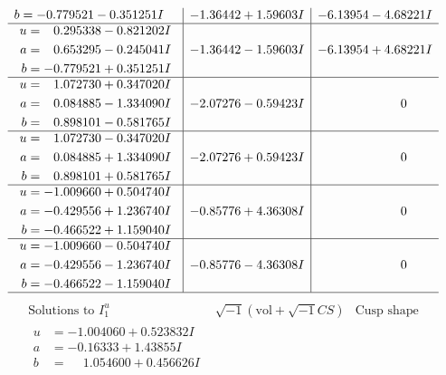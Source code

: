 \documentclass[1p]{elsarticle_modified}
\theoremstyle{definition}
\newcommand{\I}{\sqrt{-1}}
\begin{document}
$$\begin{array}{c|c|c}
\begin{aligned}
b &= -0.779521 - 0.351251 I\end{aligned}
 & -1.36442 + 1.59603 I & -6.13954 - 4.68221 I \\ \hline\begin{aligned}
u &= \phantom{-}0.295338 - 0.821202 I \\
a &= \phantom{-}0.653295 - 0.245041 I \\
b &= -0.779521 + 0.351251 I\end{aligned}
 & -1.36442 - 1.59603 I & -6.13954 + 4.68221 I \\ \hline\begin{aligned}
u &= \phantom{-}1.072730 + 0.347020 I \\
a &= \phantom{-}0.084885 - 1.334090 I \\
b &= \phantom{-}0.898101 - 0.581765 I\end{aligned}
 & -2.07276 - 0.59423 I & \phantom{-0.000000 } 0 \\ \hline\begin{aligned}
u &= \phantom{-}1.072730 - 0.347020 I \\
a &= \phantom{-}0.084885 + 1.334090 I \\
b &= \phantom{-}0.898101 + 0.581765 I\end{aligned}
 & -2.07276 + 0.59423 I & \phantom{-0.000000 } 0 \\ \hline\begin{aligned}
u &= -1.009660 + 0.504740 I \\
a &= -0.429556 + 1.236740 I \\
b &= -0.466522 + 1.159040 I\end{aligned}
 & -0.85776 + 4.36308 I & \phantom{-0.000000 } 0 \\ \hline\begin{aligned}
u &= -1.009660 - 0.504740 I \\
a &= -0.429556 - 1.236740 I \\
b &= -0.466522 - 1.159040 I\end{aligned}
 & -0.85776 - 4.36308 I & \phantom{-0.000000 } 0\\
 \hline 
 \end{array}$$\newpage$$\begin{array}{c|c|c}  
\text{Solutions to }I^u_{1}& \I (\text{vol} + \sqrt{-1}CS) & \text{Cusp shape}\\
 \hline 
\begin{aligned}
u &= -1.004060 + 0.523832 I \\
a &= -0.16333 + 1.43855 I \\
b &= \phantom{-}1.054600 + 0.456626 I\end{aligned}

\end{array}$$
\end{document}
